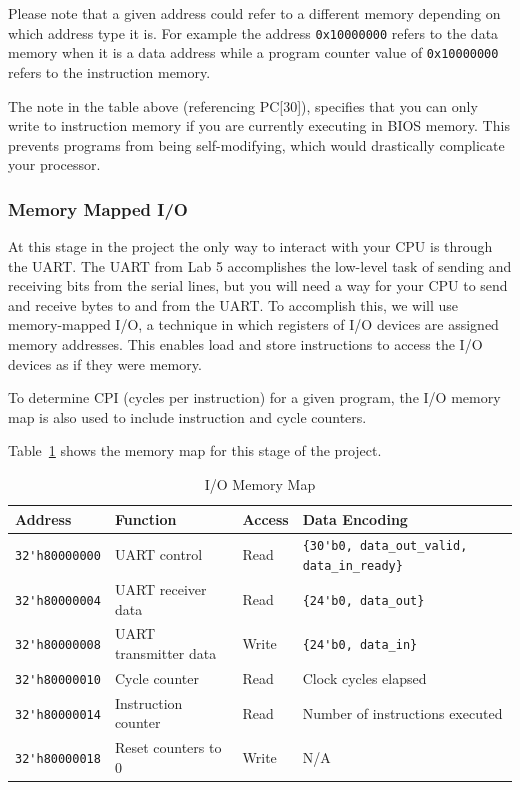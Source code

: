 \documentclass[11pt]{article}
\begin{document}
Please note that a given address could refer to a different memory depending on which address type it is.
For example the address \verb|0x10000000| refers to the data memory when it is a data address while a program counter value of \verb|0x10000000| refers to the instruction memory.

The note in the table above (referencing PC[30]), specifies that you can only write to instruction memory if you are currently executing in BIOS memory.
This prevents programs from being self-modifying, which would drastically complicate your processor.

\subsubsection{Memory Mapped I/O}
\label{mmio}
At this stage in the project the only way to interact with your CPU is through the UART.
The UART from Lab 5 accomplishes the low-level task of sending and receiving bits from the serial lines, but you will need a way for your CPU to send and receive bytes to and from the UART.
To accomplish this, we will use memory-mapped I/O, a technique in which registers of I/O devices are assigned memory addresses.
This enables load and store instructions to access the I/O devices as if they were memory.

To determine CPI (cycles per instruction) for a given program, the I/O memory map is also used to include instruction and cycle counters.

Table~\ref{mem_map1} shows the memory map for this stage of the project.

\begin{table}[hbt]
  \begin{center}
    \caption{I/O Memory Map}
    \label{mem_map1}
    \begin{tabular}{l l l l}
      \toprule
      \textbf{Address} & \textbf{Function} & \textbf{Access} & \textbf{Data Encoding}\\
      \midrule
      \verb|32'h80000000| & UART control & Read & \verb|{30'b0, data_out_valid, data_in_ready}| \\
      \verb|32'h80000004| & UART receiver data & Read & \verb|{24'b0, data_out}| \\
      \verb|32'h80000008| & UART transmitter data & Write & \verb|{24'b0, data_in}| \\
      \midrule
      \verb|32'h80000010| & Cycle counter & Read & Clock cycles elapsed \\
      \verb|32'h80000014| & Instruction counter & Read & Number of instructions executed \\
      \verb|32'h80000018| & Reset counters to 0 & Write & N/A \\
      \bottomrule
    \end{tabular}
  \end{center}
\end{table}
\end{document}
